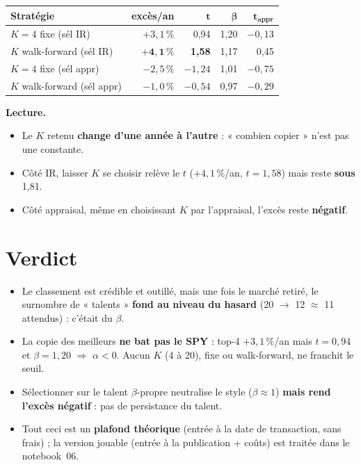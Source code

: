 \documentclass[10pt,a4paper,twocolumn]{article}
\begin{document}
\begin{center}\footnotesize\setlength{\tabcolsep}{3.5pt}
\begin{tabular}{lrrrr}
\toprule
\textbf{Stratégie} & \textbf{excès/an} & $\boldsymbol{t}$ & $\boldsymbol{\beta}$ & $\boldsymbol{t_{\text{appr}}}$\\
\midrule
$K{=}4$ fixe (sél IR)        & $+3{,}1\,\%$ & 0,94 & 1,20 & $-0{,}13$\\
$K$ walk-forward (sél IR)    & $\mathbf{+4{,}1\,\%}$ & \textbf{1,58} & 1,17 & 0,45\\
$K{=}4$ fixe (sél appr)      & $-2{,}5\,\%$ & $-1{,}24$ & 1,01 & $-0{,}75$\\
$K$ walk-forward (sél appr)  & $-1{,}0\,\%$ & $-0{,}54$ & 0,97 & $-0{,}29$\\
\bottomrule
\end{tabular}
\end{center}

\textbf{Lecture.}
\begin{itemize}
  \item Le $K$ retenu \textbf{change d'une année à l'autre} : « combien copier » n'est pas une constante.
  \item Côté IR, laisser $K$ se choisir relève le $t$ ($+4{,}1\,\%$/an, $t=1{,}58$) mais reste \textbf{sous} 1,81.
  \item Côté appraisal, même en choisissant $K$ par l'appraisal, l'excès reste \textbf{négatif}.
\end{itemize}

\section{Verdict}
\begin{itemize}
  \item Le classement est crédible et outillé, mais une fois le marché retiré, le surnombre de « talents »
        \textbf{fond au niveau du hasard} (20 $\to$ 12 $\approx$ 11 attendus) : c'était du $\beta$.
  \item La copie des meilleurs \textbf{ne bat pas le SPY} : top-4 $+3{,}1\,\%$/an mais $t=0{,}94$ et
        $\beta=1{,}20$ $\Rightarrow$ $\alpha<0$. Aucun $K$ (4 à 20), fixe ou walk-forward, ne franchit le seuil.
  \item Sélectionner sur le talent $\beta$-propre neutralise le style ($\beta\approx1$) \textbf{mais rend
        l'excès négatif} : pas de persistance du talent.
  \item Tout ceci est un \textbf{plafond théorique} (entrée à la date de transaction, sans frais) ; la
        version jouable (entrée à la publication + coûts) est traitée dans le notebook~06.
\end{itemize}
\end{document}
